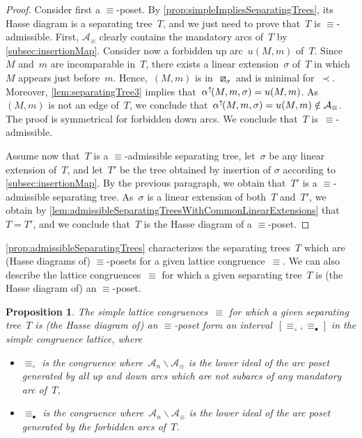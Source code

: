 \documentclass{amsart}
\newtheorem{proposition}[theorem]{Proposition}
\theoremstyle{definition}
\newcommand{\ssm}{\smallsetminus} %
\newcommand{\eqdef}{\mbox{\,\raisebox{0.2ex}{\scriptsize\ensuremath{\mathrm:}}\ensuremath{=}\,}} %
\newcommand{\darkblue}{\color{darkblue}} %
\newcommand{\defn}[1]{\textsl{\darkblue #1}} %
\newcommand{\arc}{\alpha} %
\newcommand{\arcs}{{\mathcal{A}}} %
\newcommand{\arcUp}{\smash{\alpha^{\uparrow\!}}} %
\begin{document}
\begin{proof}
Consider first a $\equiv$-poset.
By \cref{prop:simpleImpliesSeparatingTrees}, its Hasse diagram is a separating tree~$T$, and we just need to prove that~$T$ is $\equiv$-admissible.
First, $\arcs_\equiv$ clearly contains the mandatory arcs of~$T$ by \cref{subsec:insertionMap}.
Consider now a forbidden up arc~$u(M,m)$ of~$T$.
Since~$M$ and~$m$ are incomparable in~$T$, there exists a linear extension~$\sigma$ of~$T$ in which~$M$ appears just before~$m$.
Hence,~$(M,m)$ is in~$\boxslash_\sigma$ and is minimal for~$\prec$.
Moreover, \cref{lem:separatingTree3} implies that~${\arcUp(M, m, \sigma) = u(M,m)}$.
As~$(M,m)$ is not an edge of~$T$, we conclude that~${\arcUp(M, m, \sigma) = u(M,m) \notin \arcs_\equiv}$.
The proof is symmetrical for forbidden down arcs.
We conclude that~$T$ is~$\equiv$-admissible.

Assume now that~$T$ is a $\equiv$-admissible separating tree, let~$\sigma$ be any linear extension of~$T$, and let~$T'$ be the tree obtained by insertion of $\sigma$ according to \cref{subsec:insertionMap}.
By the previous paragraph, we obtain that~$T'$ is a $\equiv$-admissible separating tree.
As~$\sigma$ is a linear extension of both~$T$ and~$T'$, we obtain by \cref{lem:admissibleSeparatingTreesWithCommonLinearExtensions} that~$T = T'$, and we conclude that~$T$ is the Hasse diagram of a $\equiv$-poset.
\end{proof}

\cref{prop:admissibleSeparatingTrees} characterizes the separating trees~$T$ which are (Hasse diagrams of) $\equiv$-posets for a given lattice congruence~$\equiv$.
We can also describe the lattice congruences~$\equiv$ for which a given separating tree~$T$ is (the Hasse diagram of) an $\equiv$-poset.


\begin{proposition}
\label{prop:whichCongruences}
The simple lattice congruences~$\equiv$ for which a given separating tree~$T$ is (the Hasse diagram of) an $\equiv$-poset form an interval~$[\equiv_\circ, \equiv_\bullet]$ in the simple congruence lattice, where
\begin{itemize}
\item $\equiv_\circ$ is the congruence where~$\arcs_n \ssm \arcs_\equiv$ is the lower ideal of the arc poset generated by all up and down arcs which are not subarcs of any mandatory arc of~$T$,
\item $\equiv_\bullet$ is the congruence where~$\arcs_n \ssm \arcs_\equiv$ is the lower ideal of the arc poset generated by the forbidden arcs of~$T$.
\end{itemize}
\end{proposition}
\end{document}
